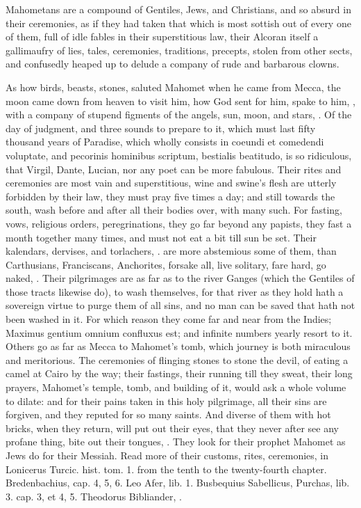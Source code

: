 {Mahometans are a compound of Gentiles, Jews, and Christians, and so
absurd in their ceremonies, as if they had taken that which is most
sottish out of every one of them, full of idle fables in their
superstitious law, their Alcoran itself a gallimaufry of lies, tales,
ceremonies, traditions, precepts, stolen from other sects, and
confusedly heaped up to delude a company of rude and barbarous clowns.

As how birds, beasts, stones, saluted Mahomet when he came from Mecca,
the moon came down from heaven to visit him, how God sent for
him, spake to him, \etc{}, with a company of stupend figments of the
angels, sun, moon, and stars, \etc{}. Of the day of judgment, and three
sounds to prepare to it, which must last fifty thousand years of
Paradise, which wholly consists in coeundi et comedendi voluptate, and
pecorinis hominibus scriptum, bestialis beatitudo, is so ridiculous,
that Virgil, Dante, Lucian, nor any poet can be more fabulous. Their
rites and ceremonies are most vain and superstitious, wine and swine's
flesh are utterly forbidden by their law, they must pray five
times a day; and still towards the south, wash before and after all
their bodies over, with many such. For fasting, vows, religious orders,
peregrinations, they go far beyond any papists, they fast a month
together many times, and must not eat a bit till sun be set. Their
kalendars, dervises, and torlachers, \etc{}. are more abstemious some
of them, than Carthusians, Franciscans, Anchorites, forsake all, live
solitary, fare hard, go naked, \etc{}. Their pilgrimages are as far
as to the river Ganges (which the Gentiles of those tracts
likewise do), to wash themselves, for that river as they hold hath a
sovereign virtue to purge them of all sins, and no man can be saved
that hath not been washed in it. For which reason they come far and
near from the Indies; Maximus gentium omnium confluxus est; and
infinite numbers yearly resort to it. Others go as far as Mecca to
Mahomet's tomb, which journey is both miraculous and meritorious. The
ceremonies of flinging stones to stone the devil, of eating a camel at
Cairo by the way; their fastings, their running till they sweat, their
long prayers, Mahomet's temple, tomb, and building of it, would ask a
whole volume to dilate: and for their pains taken in this holy
pilgrimage, all their sins are forgiven, and they reputed for so many
saints. And diverse of them with hot bricks, when they return, will put
out their eyes, that they never after see any profane thing, bite
out their tongues, \etc{}. They look for their prophet Mahomet as Jews do
for their Messiah. Read more of their customs, rites, ceremonies, in
Lonicerus Turcic. hist. tom. 1. from the tenth to the twenty-fourth
chapter. Bredenbachius, cap. 4, 5, 6. Leo Afer, lib. 1. Busbequius
Sabellicus, Purchas, lib. 3. cap. 3, et 4, 5. Theodorus Bibliander, \etc{}.

}
